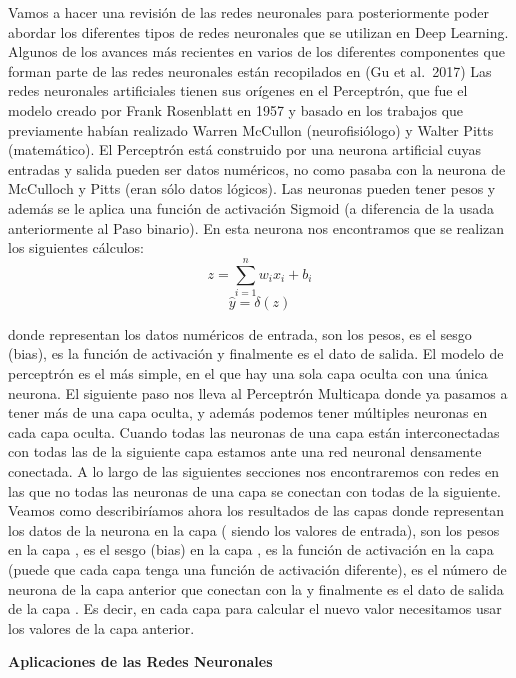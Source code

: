 \documentclass[
  a4paper,
  DIV=11,
  numbers=noendperiod]{scrreprt}
\begin{document}
Vamos a hacer una revisión de las redes neuronales para posteriormente
poder abordar los diferentes tipos de redes neuronales que se utilizan
en Deep Learning. Algunos de los avances más recientes en varios de los
diferentes componentes que forman parte de las redes neuronales están
recopilados en (Gu et al.~2017) Las redes neuronales artificiales tienen
sus orígenes en el Perceptrón, que fue el modelo creado por Frank
Rosenblatt en 1957 y basado en los trabajos que previamente habían
realizado Warren McCullon (neurofisiólogo) y Walter Pitts (matemático).
El Perceptrón está construido por una neurona artificial cuyas entradas
y salida pueden ser datos numéricos, no como pasaba con la neurona de
McCulloch y Pitts (eran sólo datos lógicos). Las neuronas pueden tener
pesos y además se le aplica una función de activación Sigmoid (a
diferencia de la usada anteriormente al Paso binario). En esta neurona
nos encontramos que se realizan los siguientes cálculos:
\[ z = \sum_{i=1}^{n}w_ix_i+b_i\] \[\hat{y} = \delta (z)\]

donde representan los datos numéricos de entrada, son los pesos, es el
sesgo (bias), es la función de activación y finalmente es el dato de
salida. El modelo de perceptrón es el más simple, en el que hay una sola
capa oculta con una única neurona. El siguiente paso nos lleva al
Perceptrón Multicapa donde ya pasamos a tener más de una capa oculta, y
además podemos tener múltiples neuronas en cada capa oculta. Cuando
todas las neuronas de una capa están interconectadas con todas las de la
siguiente capa estamos ante una red neuronal densamente conectada. A lo
largo de las siguientes secciones nos encontraremos con redes en las que
no todas las neuronas de una capa se conectan con todas de la siguiente.
Veamos como describiríamos ahora los resultados de las capas donde
representan los datos de la neurona en la capa ( siendo los valores de
entrada), son los pesos en la capa , es el sesgo (bias) en la capa , es
la función de activación en la capa (puede que cada capa tenga una
función de activación diferente), es el número de neurona de la capa
anterior que conectan con la y finalmente es el dato de salida de la
capa . Es decir, en cada capa para calcular el nuevo valor necesitamos
usar los valores de la capa anterior.

\textbf{Aplicaciones de las Redes Neuronales}
\end{document}
